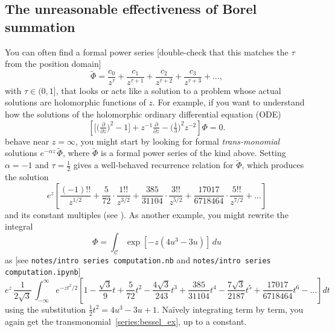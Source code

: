 \documentclass{article}
\newcommand{\series}[1]{\tilde{#1}}
\theoremstyle{definition}
\theoremstyle{plain}
\newenvironment{verify}{\color{ForestGreen}}{\color{black}}
\newenvironment{todo}{\color{Coral}}{\color{black}}
\begin{document}
\subsection{The unreasonable effectiveness of Borel summation}\label{intro:summation}
You can often find a formal power series \begin{todo}[double-check that this matches the $\tau$ from the position domain]\end{todo}
\[ \series{\Phi} = \frac{c_0}{z^\tau} + \frac{c_1}{z^{\tau+1}} + \frac{c_2}{z^{\tau+2}} + \frac{c_3}{z^{\tau+3}} + \ldots, \]
with $\tau \in (0, 1]$, that looks or acts like a solution to a problem whose actual solutions are holomorphic functions of $z$. For example, if you want to understand how the solutions of the holomorphic ordinary differential equation (ODE)
\begin{equation}
\left[ \big[ \big(\tfrac{\partial}{\partial z}\big)^2 - 1 \big] + z^{-1} \tfrac{\partial}{\partial z} - \big(\tfrac{1}{3}\big)^2 z^{-2} \right] \Phi= 0. \label{eqn:bessel_rescaled_ex}
\end{equation}
behave near $z = \infty$, you might start by looking for formal {\em trans-monomial} solutions $e^{-\alpha z}\,\series{\Phi}$, where $\series{\Phi}$ is a formal power series of the kind above. Setting $\alpha = -1$ and $\tau = \tfrac{1}{2}$ gives a well-behaved recurrence relation for $\series{\Phi}$, which produces the solution 
\begin{equation}
e^{z} \left[ \frac{(-1)!!}{z^{1/2}} + \frac{5}{72} \cdot \frac{1!!}{z^{3/2}} + \frac{385}{31104} \cdot \frac{3!!}{z^{5/2}} + \frac{17017}{6718464} \cdot \frac{5!!}{z^{7/2}} + \ldots \right] \label{series:bessel_ex}
\end{equation}
and its constant multiples (see \cite[equation 10.40.1]{dlmf}). As another example, you might rewrite the integral
\begin{equation}\label{int:bessel_ex}
\Phi = \int_{\mathcal{C}} \exp\left[-z \left(4 u^3 - 3 u\right)\right]\,du
\end{equation}
as \begin{verify}[see \texttt{notes/intro series computation.nb} and \texttt{notes/intro series computation.ipynb}]\end{verify}
\[ e^{z}\, \frac{1}{2\sqrt{3}}\, \int_{-\infty}^\infty e^{-z t^2/2} \left[ 1 - \frac{\sqrt{3}}{9} t + \frac{5}{72} t^2 - \frac{4\sqrt{3}}{243} t^3 + \frac{385}{31104} t^4 - \frac{7\sqrt{3}}{2187} t^5 + \frac{17017}{6718464} t^6 - \ldots \right] dt \]
using the substitution $\tfrac{1}{2} t^2 = 4u^3 - 3u + 1$. Na\"{i}vely integrating term by term, you again get the transmonomial~\eqref{series:bessel_ex}, up to a constant.
\end{document}
